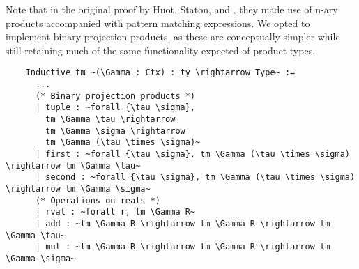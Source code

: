   Note that in the original proof by Huot, Staton, and \Vakar{} \cite{huot2020correctness}, they made use of n-ary products accompanied with pattern matching expressions.
  We opted to implement binary projection products, as these are conceptually simpler while still retaining much of the same functionality expected of product types.

  \begin{verbatim}
    Inductive tm ~(\Gamma : Ctx) : ty \rightarrow Type~ :=
      ...
      (* Binary projection products *)
      | tuple : ~forall {\tau \sigma},
        tm \Gamma \tau \rightarrow
        tm \Gamma \sigma \rightarrow
        tm \Gamma (\tau \times \sigma)~
      | first : ~forall {\tau \sigma}, tm \Gamma (\tau \times \sigma) \rightarrow tm \Gamma \tau~
      | second : ~forall {\tau \sigma}, tm \Gamma (\tau \times \sigma) \rightarrow tm \Gamma \sigma~
      (* Operations on reals *)
      | rval : ~forall r, tm \Gamma R~
      | add : ~tm \Gamma R \rightarrow tm \Gamma R \rightarrow tm \Gamma \tau~
      | mul : ~tm \Gamma R \rightarrow tm \Gamma R \rightarrow tm \Gamma \sigma~
  \end{verbatim}





